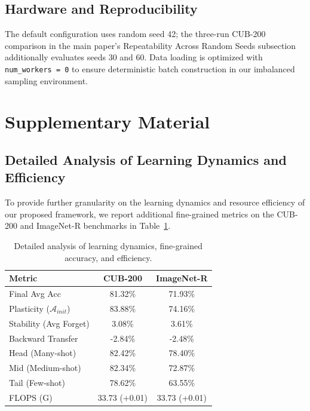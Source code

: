 \documentclass[journal]{IEEEtran}
\theoremstyle{plain}
\theoremstyle{definition}
\theoremstyle{remark}
\begin{document}
\subsection{Hardware and Reproducibility}
The default configuration uses random seed 42; the three-run CUB-200 comparison in the main paper's Repeatability Across Random Seeds subsection additionally evaluates seeds 30 and 60. Data loading is optimized with \texttt{num\_workers = 0} to ensure deterministic batch construction in our imbalanced sampling environment.

\section{Supplementary Material}
\subsection{Detailed Analysis of Learning Dynamics and Efficiency}
\label{sec:appendix_detailed_metrics}

To provide further granularity on the learning dynamics and resource efficiency of our proposed framework, we report additional fine-grained metrics on the CUB-200 and ImageNet-R benchmarks in Table~\ref{tab:detailed_metrics_appendix}.

\begin{table}[h]
  \centering
  \caption{Detailed analysis of learning dynamics, fine-grained accuracy, and efficiency.}
  \label{tab:detailed_metrics_appendix}
  \small
  \setlength{\tabcolsep}{8pt} 
  \begin{tabular}{lcc}
    \toprule
    \textbf{Metric} & \textbf{CUB-200} & \textbf{ImageNet-R} \\
    \midrule
    Final Avg Acc & 81.32\% & 71.93\% \\
    Plasticity ($\mathcal{A}_{init}$) & 83.88\% & 74.16\% \\
    Stability (Avg Forget) & 3.08\% & 3.61\% \\
    Backward Transfer & -2.84\% & -2.48\% \\
    \midrule
    Head (Many-shot) & 82.42\% & 78.40\% \\
    Mid (Medium-shot) & 82.34\% & 72.87\% \\
    Tail (Few-shot) & 78.62\% & 63.55\% \\
    \midrule
    FLOPS (G) & 33.73 \footnotesize{(+0.01)} & 33.73 \footnotesize{(+0.01)} \\
    \bottomrule
  \end{tabular}
\end{table}
\end{document}
